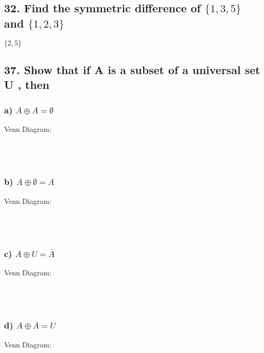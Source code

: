 \documentclass[11pt, oneside]{article} %
\numberwithin{equation}{section} %
\numberwithin{figure}{section} %
\numberwithin{table}{section} %
\begin{document}
\subsection{32. Find the symmetric difference of $\{1, 3, 5\}$ and $\{1, 2, 3\}$}
$\{2,5\}$


\subsection{37. Show that if A is a subset of a universal set U , then}
\subsubsection{a) $A\oplus A=\emptyset$}
Venn Diagram: \\\\\\\\
\subsubsection{b) $A\oplus \emptyset=A$}
Venn Diagram: \\\\\\\\
\subsubsection{c) $A\oplus U =\overline{A}$}
Venn Diagram: \\\\\\\\
\subsubsection{d) $A\oplus \overline{A} = U$}
Venn Diagram: \\\\\\\\



\section{}
\end{document}
